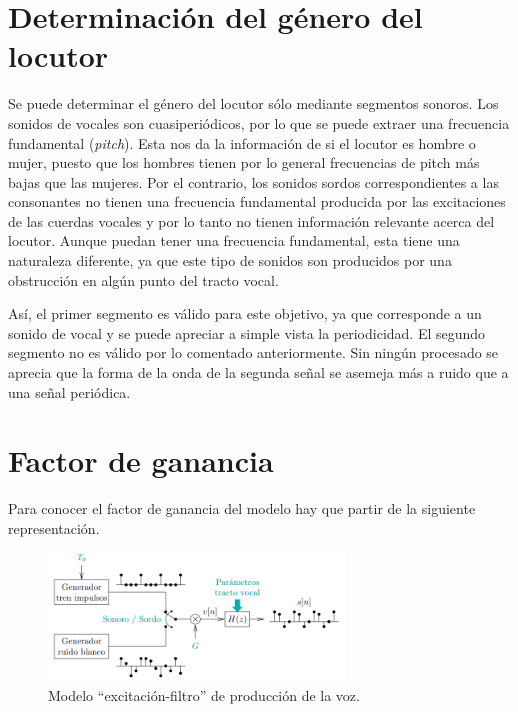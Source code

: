 \documentclass[12pt]{article}
\begin{document}
\pagebreak


\section{Determinación del género del locutor}
Se puede determinar el género del locutor sólo mediante segmentos sonoros. Los sonidos de vocales son cuasiperiódicos, por lo que se puede extraer una frecuencia fundamental (\textit{pitch}). Esta nos da la información de si el locutor es hombre o mujer, puesto que los hombres tienen por lo general frecuencias de pitch más bajas que las mujeres. Por el contrario, los sonidos sordos correspondientes a las consonantes no tienen una frecuencia fundamental producida por las excitaciones de las cuerdas vocales y por lo tanto no tienen información relevante acerca del locutor. Aunque puedan tener una frecuencia fundamental, esta tiene una naturaleza diferente, ya que este tipo de sonidos son producidos por una obstrucción en algún punto del tracto vocal.

Así, el primer segmento es válido para este objetivo, ya que corresponde a un sonido de vocal y se puede apreciar a simple vista la periodicidad. El segundo segmento no es válido por lo comentado anteriormente. Sin ningún procesado se aprecia que la forma de la onda de la segunda señal se asemeja más a ruido que a una señal periódica.


\section{Factor de ganancia}
Para conocer el factor de ganancia del modelo hay que partir de la siguiente representación.

\begin{figure}[H]
	\centering
	\includegraphics[width=0.7\textwidth]{modelo_produccion_voz.PNG}
	\caption{Modelo “excitación-filtro” de producción de la voz. }
\end{figure}
\end{document}
